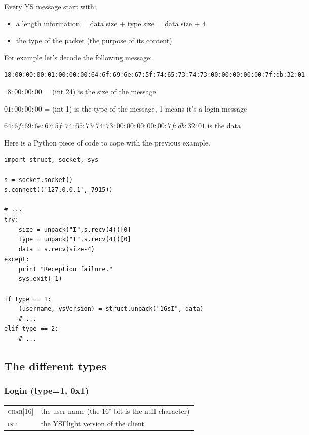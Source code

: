 \documentclass{article}
\newcommand{\gray}{\rowcolor[gray]{.92}}
\begin{document}
\vspace{0.5cm}
Every YS message start with:
\begin{itemize}
    \item a length information = data size + type size = data size + 4
    \item the type of the packet (the purpose of its content)
\end{itemize}

\vspace{0.3cm}
For example let's decode the following message:
\begin{verbatim}
18:00:00:00:01:00:00:00:64:6f:69:6e:67:5f:74:65:73:74:73:00:00:00:00:00:7f:db:32:01
\end{verbatim}

$18:00:00:00$ = (int 24) is the size of the message

$01:00:00:00$ = (int 1) is the type of the message, 1 means it's a login message

$64:6f:69:6e:67:5f:74:65:73:74:73:00:00:00:00:00:7f:db:32:01$ is the data

\vspace{0.3cm}
Here is a Python piece of code to cope with the previous example.

\begin{verbatim}	
import struct, socket, sys

s = socket.socket()
s.connect(('127.0.0.1', 7915))

# ...
try:
    size = unpack("I",s.recv(4))[0]
    type = unpack("I",s.recv(4))[0]
    data = s.recv(size-4)
except:
    print "Reception failure."
    sys.exit(-1)
    
if type == 1:
	(username, ysVersion) = struct.unpack("16sI", data)
	# ...
elif type == 2:
	# ...
\end{verbatim}

\subsection{The different types}


\subsubsection{Login (type=1, 0x1)}

\begin{tabularx}{\linewidth}{>{\raggedleft\scshape\small}p{2.5cm}X}
 char[16] & the user name (the 16$^e$ bit is the null character)\\
\gray int & the YSFlight version of the client\\
\end{tabularx}
\end{document}
